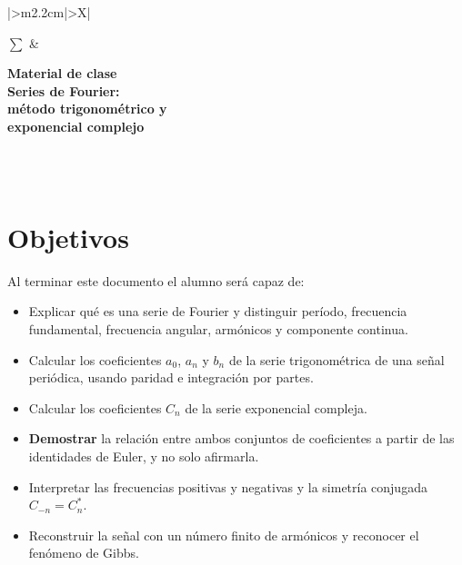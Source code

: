 \documentclass[11pt,a4paper]{article}
\begin{document}
\begingroup
\renewcommand{\tabularxcolumn}[1]{m{#1}}
\renewcommand{\arraystretch}{2.0}
\setlength{\tabcolsep}{12pt}
\noindent
\begin{tabularx}{\textwidth}{|>{\centering\arraybackslash}m{2.2cm}|>{\centering\arraybackslash}X|}
\hline
\rule{0pt}{2.1cm}{\fontsize{58}{58}\selectfont\bfseries $\sum$}
    & \begin{minipage}[c]{\linewidth}\centering
          {\large\bfseries Material de clase}\\[7pt]
          {\Large\bfseries Series de Fourier:\\
           método trigonométrico y\\ exponencial complejo}
      \end{minipage}\\
\hline
{}\\
\hline
\end{tabularx}
\endgroup

\vspace{0.8cm}

\section{Objetivos}
Al terminar este documento el alumno será capaz de:

\begin{itemize}
    \item Explicar qué es una serie de Fourier y distinguir período, frecuencia
          fundamental, frecuencia angular, armónicos y componente continua.
    \item Calcular los coeficientes $a_0$, $a_n$ y $b_n$ de la serie
          trigonométrica de una señal periódica, usando paridad e integración
          por partes.
    \item Calcular los coeficientes $C_n$ de la serie exponencial compleja.
    \item \textbf{Demostrar} la relación entre ambos conjuntos de coeficientes a
          partir de las identidades de Euler, y no solo afirmarla.
    \item Interpretar las frecuencias positivas y negativas y la simetría
          conjugada $C_{-n}=C_n^{*}$.
    \item Reconstruir la señal con un número finito de armónicos y reconocer el
          fenómeno de Gibbs.
\end{itemize}
\end{document}
